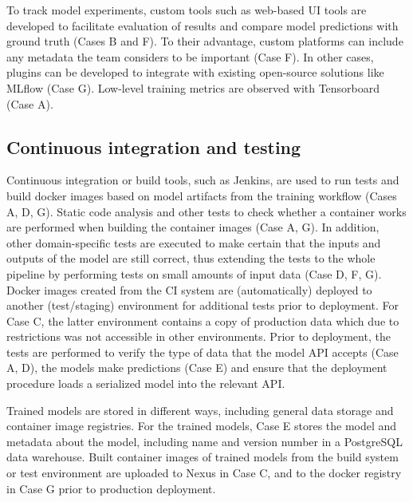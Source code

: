 
 
To track model experiments, custom tools such as web-based UI tools are developed to facilitate evaluation of results and compare model predictions with ground truth (Cases B and F). To their advantage, custom platforms can include any metadata the team considers to be important (Case F). In other cases, plugins can be developed to integrate with existing open-source solutions like MLflow (Case G). Low-level training metrics are observed with Tensorboard (Case A).

\subsection{Continuous integration and testing}

Continuous integration or build tools, such as Jenkins, are used to run tests and build docker images based on model artifacts from the training workflow (Cases A, D, G). Static code analysis and other tests to check whether a container works are performed when building the container images (Case A, G). In addition, other domain-specific tests are executed to make certain that the inputs and outputs of the model are still correct, thus extending the tests to the whole pipeline by performing tests on small amounts of input data (Case D, F, G). Docker images created from the CI system are (automatically) deployed to another (test/staging) environment for additional tests prior to deployment. %
For Case C, the latter environment contains a copy of production data which due to restrictions was not accessible in other environments. Prior to deployment, the tests are performed to verify the type of data that the model API accepts (Case A, D), the models make predictions (Case E) and ensure that the deployment procedure loads a serialized model into the relevant API.

Trained models are stored in different ways, including general data storage and container image registries. For the trained models, Case E stores the model and metadata about the model, including name and version number in a PostgreSQL data warehouse. Built container images of trained models from the build system or test environment are uploaded to Nexus in Case C, and to the docker registry in Case G prior to production deployment. 

